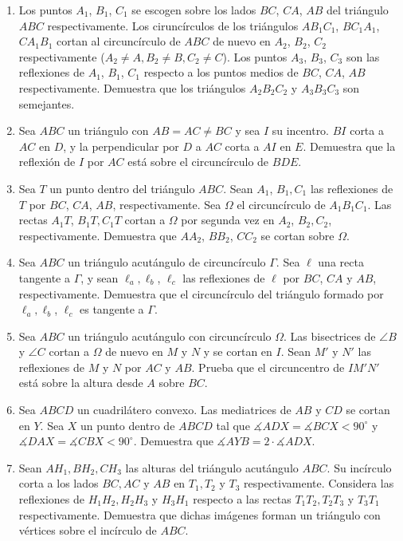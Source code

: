 \documentclass[11pt]{scrartcl}
\begin{document}
\begin{enumerate}
    \item Los puntos $ A_{1}$, $ B_{1}$, $ C_{1}$ se escogen sobre los lados $ BC$, $ CA$, $ AB$ del triángulo $ ABC$ respectivamente. Los ciruncírculos de los triángulos $ AB_{1}C_{1}$, $ BC_{1}A_{1}$, $ CA_{1}B_{1}$ cortan al circuncírculo de $ ABC$ de nuevo en $ A_{2}$, $ B_{2}$, $ C_{2}$ respectivamente ($ A_{2}\neq A, B_{2}\neq B, C_{2}\neq C$). Los puntos $ A_{3}$, $ B_{3}$, $ C_{3}$ son las reflexiones de $ A_{1}$, $ B_{1}$, $ C_{1}$ respecto a los puntos medios de $ BC$, $ CA$, $ AB$ respectivamente. Demuestra que los triángulos $ A_{2}B_{2}C_{2}$ y $ A_{3}B_{3}C_{3}$ son semejantes.
    \item Sea $ABC$ un triángulo con $AB = AC \neq BC$ y sea $I$ su incentro. $BI$ corta a $AC$ en $D$, y la perpendicular por $D$ a $AC$ corta a $AI$ en $E$. Demuestra que la reflexión de $I$ por $AC$ está sobre el circuncírculo de $BDE$.
    \item Sea $T$ un punto dentro del triángulo $ABC$. Sean $A_1$, $B_1, C_1$ las reflexiones de $T$ por $BC$, $CA$, $AB$, respectivamente. Sea $\Omega$ el circuncírculo de $A_1B_1C_1$. Las rectas $A_1T$, $B_1T, C_1T$ cortan a $\Omega$ por segunda vez en $A_2$, $B_2, C_2$, respectivamente. Demuestra que $AA_2$, $BB_2$, $CC_2$ se cortan sobre $\Omega$.
    \item Sea $ABC$ un triángulo acutángulo de circuncírculo $\Gamma$. Sea $\ell$ una recta tangente a $\Gamma$, y sean $\ell_a, \ell_b$, $\ell_c$ las reflexiones de $\ell$ por $BC$, $CA$ y $AB$, respectivamente. Demuestra que el circuncírculo del triángulo formado por $\ell_a, \ell_b$, $\ell_c$ es tangente a $\Gamma$.
    \item Sea $ABC$ un triángulo acutángulo con circuncírculo $\Omega$. Las bisectrices de $\angle B$ y $\angle C$ cortan a $\Omega$ de nuevo en $M$ y $N$ y se cortan en $I$. Sean $M'$ y $N'$ las reflexiones de $M$ y $N$ por $AC$ y $AB$. Prueba que el circuncentro de $IM'N'$ está sobre la altura desde $A$ sobre $BC$.
    \item Sea $ ABCD$ un cuadrilátero convexo. Las mediatrices de $ AB$ y $ CD$ se cortan en $ Y$. Sea $ X$ un punto dentro de $ ABCD$ tal que $ \measuredangle ADX = \measuredangle BCX < 90^{\circ}$ y $ \measuredangle DAX = \measuredangle CBX < 90^{\circ}$. Demuestra que $ \measuredangle AYB = 2\cdot\measuredangle ADX$.
    \item Sean $ AH_1, BH_2, CH_3$ las alturas del triángulo acutángulo $ ABC$. Su incírculo corta a los lados $ BC, AC$ y $ AB$ en $ T_1, T_2$ y $ T_3$ respectivamente. Considera las reflexiones de $ H_1H_2, H_2H_3$ y $ H_3H_1$ respecto a las rectas $ T_1T_2, T_2T_3$ y $ T_3T_1$ respectivamente. Demuestra que dichas imágenes forman un triángulo con vértices sobre el incírculo de $ ABC$.
\end{enumerate}
\end{document}
